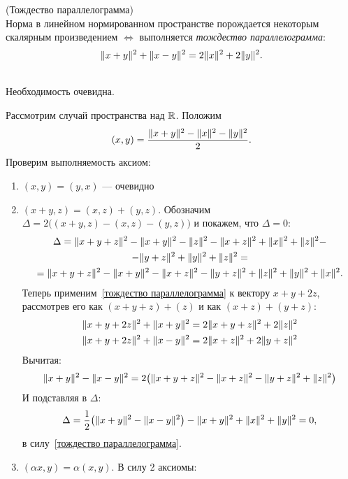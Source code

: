 \begin{theorem}
(Тождество параллелограмма)\\
Норма в линейном нормированном пространстве порождается некоторым скалярным произведением $\Leftrightarrow$ выполняется \emph{тождество параллелограмма}:
\begin{equation}
    \label{тождество параллелограмма}
    \|x + y\|^2 + \|x - y\|^2 = 2\|x\|^2 + 2\|y\|^2.
\end{equation}
\end{theorem}
\begin{proofocre}
~\\
\boxed{\Rightarrow} Необходимость очевидна.

\boxed{\Leftarrow} Рассмотрим случай пространства над ${\mathbb{R}}$. Положим
$$(x, y) = \frac{\|x + y\|^2 - \|x\|^2 - \|y\|^2}{2}.$$
Проверим выполняемость аксиом:
\begin{enumerate}
    \item $(x, y) = (y, x)$ --- очевидно
    \item $(x + y, z) = (x, z) + (y, z)$. Обозначим $\Delta = 2\big( (x + y, z) - (x, z) - (y, z) \big)$ и покажем, что $\Delta = 0$:
    \begin{multline*}
        \Delta = \|x + y + z\|^2 - \|x + y\|^2 - \|z\|^2 - \|x + z\|^2 + \|x\|^2 + \|z\|^2 - \\ - \|y + z\|^2 + \|y\|^2 + \|z\|^2 = \\ = \|x + y + z\|^2 - \|x + y\|^2 - \|x + z\|^2 - \|y + z\|^2 + \|z\|^2 + \|y\|^2 + \|x\|^2.
    \end{multline*}
    Теперь применим~\eqref{тождество параллелограмма} к вектору $x + y + 2z$, рассмотрев его как $(x + y + z) + (z)$ и как $(x + z) + (y + z)$:
    \begin{gather*}
        \|x + y + 2z\|^2 + \|x + y\|^2 = 2\|x + y + z\|^2 + 2\|z\|^2\\
        \|x + y + 2z\|^2 + \|x - y\|^2 = 2\|x + z\|^2 + 2\|y + z\|^2
    \end{gather*}
    Вычитая:
    $$\|x + y\|^2 - \|x - y\|^2 = 2\big(\|x + y +z\|^2 -\|x + z\|^2 - \|y + z\|^2 + \|z\|^2\big)$$
    И подставляя в $\Delta$:
    $$\Delta = \frac{1}{2}\big(\|x + y\|^2 - \|x - y\|^2\big) - \|x + y\|^2 + \|x\|^2 + \|y\|^2 = 0,$$
    в силу~\eqref{тождество параллелограмма}.
    \item $(\alpha x, y) = \alpha(x, y)$. В силу 2 аксиомы:
    \begin{enumerate}

\end{enumerate}
\end{enumerate}
\end{proofocre}
